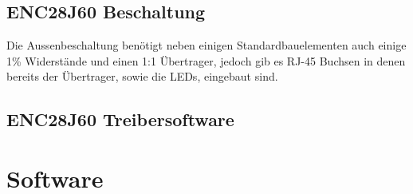 \documentclass[a4paper,14pt,headsepline]{scrartcl}
\begin{document}
\subsection{ENC28J60 Beschaltung}
Die Aussenbeschaltung benötigt neben einigen Standardbauelementen auch einige 1\% Widerstände und einen 1:1 Übertrager, jedoch gib es RJ-45 Buchsen in denen bereits der Übertrager, sowie die LEDs, eingebaut sind.
\begin{figure}[h]
\begin{center}
\end{center}
\end{figure}



\subsection{ENC28J60 Treibersoftware}

\section{Software}

 
\end{document}
